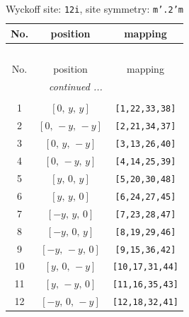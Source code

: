 \documentclass[fleqn,8pt]{jsarticle}
\begin{document}
\begin{longtable}{ccc}
\caption{Wyckoff site: {\tt 12i}, site symmetry: {\tt m'.2'm}}
 \\
 \hline \hline
No. & position & mapping \\ \hline \endfirsthead

\multicolumn{2}{l}{\tablename\ \thetable{}} \\
 \hline \hline
No. & position & mapping \\ \hline \endhead

 \hline \hline
\multicolumn{2}{r}{\footnotesize\it continued ...} \\ \endfoot

 \hline \hline
\multicolumn{2}{r}{} \\ \endlastfoot

1 & $\left[ 0,\, y,\, y \right]$ & {\tt [1,22,33,38]} \\ \hline
2 & $\left[ 0,\, - y,\, - y \right]$ & {\tt [2,21,34,37]} \\ \hline
3 & $\left[ 0,\, y,\, - y \right]$ & {\tt [3,13,26,40]} \\ \hline
4 & $\left[ 0,\, - y,\, y \right]$ & {\tt [4,14,25,39]} \\ \hline
5 & $\left[ y,\, 0,\, y \right]$ & {\tt [5,20,30,48]} \\ \hline
6 & $\left[ y,\, y,\, 0 \right]$ & {\tt [6,24,27,45]} \\ \hline
7 & $\left[ - y,\, y,\, 0 \right]$ & {\tt [7,23,28,47]} \\ \hline
8 & $\left[ - y,\, 0,\, y \right]$ & {\tt [8,19,29,46]} \\ \hline
9 & $\left[ - y,\, - y,\, 0 \right]$ & {\tt [9,15,36,42]} \\ \hline
10 & $\left[ y,\, 0,\, - y \right]$ & {\tt [10,17,31,44]} \\ \hline
11 & $\left[ y,\, - y,\, 0 \right]$ & {\tt [11,16,35,43]} \\ \hline
12 & $\left[ - y,\, 0,\, - y \right]$ & {\tt [12,18,32,41]} \\
\end{longtable}
\renewcommand{\arraystretch}{1.2}
\end{document}
